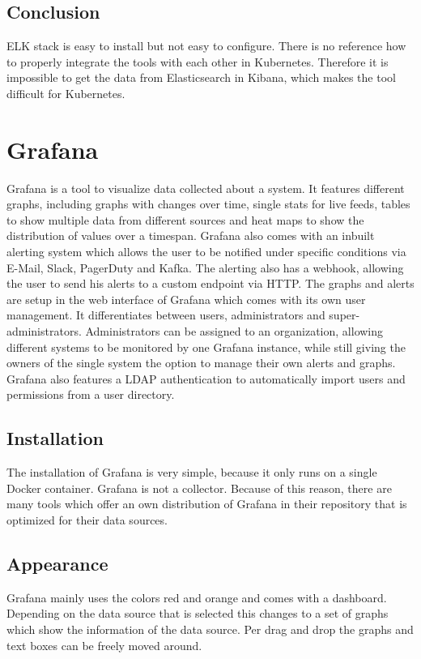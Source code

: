 \subsection{Conclusion}
ELK stack is easy to install but not easy to configure. There is no reference how to properly integrate the tools with each other in Kubernetes. Therefore it is impossible to get the data from Elasticsearch in Kibana, which makes the tool difficult for Kubernetes.


\section{Grafana}
\label{grafana} %
Grafana is a tool to visualize data collected about a system. It features different graphs, including graphs with changes over time, single stats for live feeds, tables to show multiple data from different sources and heat maps to show the distribution of values over a timespan.
Grafana also comes with an inbuilt alerting system which allows the user to be notified under specific conditions via E-Mail, Slack, PagerDuty and Kafka. The alerting also has a webhook, allowing the user to send his alerts to a custom endpoint via HTTP.
The graphs and alerts are setup in the web interface of Grafana which comes with its own user management. It differentiates between users, administrators and super-administrators. Administrators can be assigned to an organization, allowing different systems to be monitored by one Grafana instance, while still giving the owners of the single system the option to manage their own alerts and graphs.
Grafana also features a LDAP authentication to automatically import users and permissions from a user directory.
\subsection{Installation}
The installation of Grafana is very simple, because it only runs on a single Docker container. Grafana is not a collector. Because of this reason, there are many tools which offer an own distribution of Grafana in their repository that is optimized for their data sources.
\subsection{Appearance}%
Grafana mainly uses the colors red and orange and comes with a dashboard. Depending on the data source that is selected this changes to a set of graphs which show the information of the data source. Per drag and drop the graphs and text boxes can be freely moved around. 
